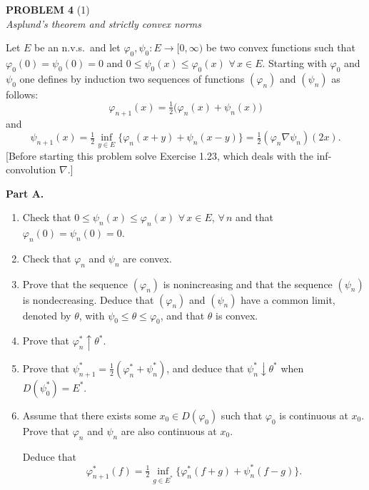 \documentclass[12pt]{article}
\begin{document}
\bigskip

\noindent\textbf{PROBLEM 4} (1)\\[4pt]
\textit{Asplund's theorem and strictly convex norms}

\medskip

Let $E$ be an n.v.s.\ and let $\varphi_0, \psi_0 : E \to [0,\infty)$ be two convex functions such
that $\varphi_0(0) = \psi_0(0) = 0$ and $0 \le \psi_0(x) \le \varphi_0(x)$ $\forall\, x \in E$. Starting with
$\varphi_0$ and $\psi_0$ one defines by induction two sequences of functions $(\varphi_n)$ and $(\psi_n)$ as follows:
\[
\varphi_{n+1}(x) = \tfrac{1}{2}\bigl(\varphi_n(x) + \psi_n(x)\bigr)
\]
and
\[
\psi_{n+1}(x) = \tfrac{1}{2}\inf_{y \in E}\{\varphi_n(x+y) + \psi_n(x-y)\} = \tfrac{1}{2}(\varphi_n \nabla\psi_n)(2x).
\]
[Before starting this problem solve Exercise 1.23, which deals with the inf-convolution $\nabla$.]

\medskip

\noindent\textbf{Part A.}

\begin{enumerate}
\item Check that $0 \le \psi_n(x) \le \varphi_n(x)$ $\forall\, x \in E$, $\forall\, n$ and that $\varphi_n(0) = \psi_n(0) = 0$.

\item Check that $\varphi_n$ and $\psi_n$ are convex.

\item Prove that the sequence $(\varphi_n)$ is nonincreasing and that the sequence $(\psi_n)$ is
nondecreasing. Deduce that $(\varphi_n)$ and $(\psi_n)$ have a common limit, denoted by $\theta$,
with $\psi_0 \le \theta \le \varphi_0$, and that $\theta$ is convex.

\item Prove that $\varphi_n^* \uparrow \theta^*$.

\item Prove that $\psi_{n+1}^* = \tfrac{1}{2}(\varphi_n^* + \psi_n^*)$, and deduce that $\psi_n^* \downarrow \theta^*$
when $D(\psi_0^*) = E^*$.

\item Assume that there exists some $x_0 \in D(\varphi_0)$ such that $\varphi_0$ is continuous at $x_0$.
Prove that $\varphi_n$ and $\psi_n$ are also continuous at $x_0$.


\noindent Deduce that
\[
\varphi_{n+1}^*(f) = \tfrac{1}{2}\inf_{g \in E^*}\{\varphi_n^*(f+g) + \psi_n^*(f-g)\}.
\]
\end{enumerate}
\end{document}
